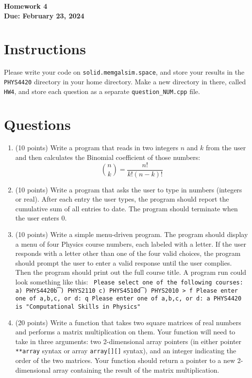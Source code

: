 \documentclass[11pt]{article}
\begin{document}
\begin{center}
\textbf{\Large Homework 4}\\
\textbf{Due: February 23, 2024}\\
\end{center}
\section*{Instructions}
Please write your code on \texttt{solid.memgalsim.space}, and store your results
in the \texttt{PHYS4420} directory in your home directory.  Make a new directory in there, called \texttt{HW4}, and 
store each question as a separate \texttt{question\_NUM.cpp} file.
\section*{Questions}
\begin{enumerate}
    \item (10 points) Write a program that reads in two integers $n$ and $k$ from the user and then
        calculates the Binomial coefficient of those numbers:
        $$ {n \choose k} = \frac{n!}{k!(n-k)!}$$
    \item (10 points) Write a program that asks the user to type in numbers (integers or
        real).  After each entry the user types, the program should report the
        cumulative sum of all entries to date.  The program should terminate
        when the user enters 0.
    \item (10 points) Write a simple menu-driven program.  The program should display a menu
        of four Physics course numbers, each labeled with a letter.  If the user
        responds with a letter other than one of the four valid choices, the
        program should prompt the user to enter a valid response until the user
        complies.  Then the program should print out the full course title.  A
        program run could look something like this:
        \texttt{
            Please select one of the following courses:
            a) PHYS4420\t b) PHYS2110
            c) PHYS4510\t d) PHYS2010
            > f
            Please enter one of a,b,c, or d: q
            Please enter one of a,b,c, or d: a
            PHYS4420 is "Computational Skills in Physics"
        }
    \item (20 points) Write a function that takes two square matrices of real numbers and
        performs a matrix multiplication on them.  Your function will need to
        take in three arguments: two 2-dimensional array pointers (in either
        pointer \texttt{**array} syntax or array \texttt{array[][]} syntax), and
        an integer indicating the order of the two matrices.  Your function
        should return a pointer to a new 2-dimensional array containing the
        result of the matrix multiplication.
\end{enumerate}
\end{document}

